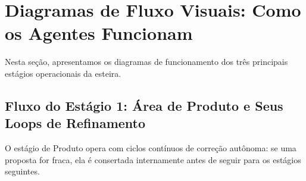 \documentclass[11pt,a4paper]{article}
\begin{document}
\section{Diagramas de Fluxo Visuais: Como os Agentes Funcionam}
\label{sec:diagramas}

Nesta seção, apresentamos os diagramas de funcionamento dos três principais estágios operacionais da esteira.

\subsection{Fluxo do Estágio 1: Área de Produto e Seus Loops de Refinamento}
O estágio de Produto opera com ciclos contínuos de correção autônoma: se uma proposta for fraca, ela é consertada internamente antes de seguir para os estágios seguintes.
\end{document}
